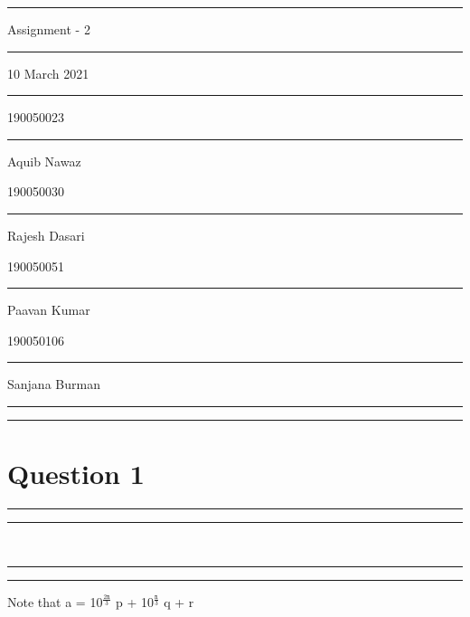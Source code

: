 \documentclass{report}
\newcommand{\answerbox}[1]{\fbox{\rule{0.8in}{0pt}\textbf{#1}\rule[-0.25ex]{0pt}{3.5ex}}}
\begin{document}
 \null
 \rule[0mm]{16cm}{0.4pt}
 \begin{center}%
  {\LARGE Assignment - 2\par}%
 \end{center}%
 \par
 \begin{center}
 {\rule[0mm]{8cm}{0.4pt}}
 \end{center}
 \begin{center}%
  {\LARGE 10 March 2021 \par}%
 \end{center}
 \begin{center}
 {\rule[0mm]{8cm}{0.4pt}}
 \end{center}
 \begin{center}
  \large 190050023 \rule[0.5mm]{1cm}{0pt} Aquib Nawaz\par
 \end{center}
 \begin{center}
  \large 190050030 \rule[0.5mm]{0.9cm}{0pt} Rajesh Dasari\par
 \end{center}
 \begin{center}
  \large 190050051 \rule[0.5mm]{0.8cm}{0pt}Paavan Kumar\par
 \end{center}
 \begin{center}
  \large 190050106 \rule[0.5mm]{0.4cm}{0pt} Sanjana Burman\par
  \rule[0mm]{8cm}{0.4pt}
 \end{center}
 \rule[12mm]{16cm}{0.4pt}
 \section*{Question 1}
 \begin{center}
     \answerbox{p} \rule[0.5mm]{0.2cm}{0pt} \answerbox{q} \rule[0.5mm]{0.2cm}{0pt} \answerbox{r} \\
     \answerbox{p} \rule[0.5mm]{0.2cm}{0pt} \answerbox{q} \rule[0.5mm]{0.2cm}{0pt} \answerbox{r}
 \end{center}
 Note that a = 10$^{\frac{2\mathtt{n}}{3}}$ p + 10$^{\frac{\mathtt{n}}{3}}$ q + r\par
\end{document}
